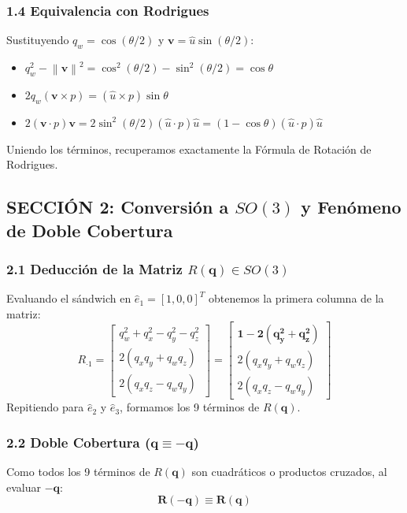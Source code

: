 \documentclass[11pt, a4paper]{article}
\begin{document}
\subsubsection*{1.4 Equivalencia con Rodrigues}
Sustituyendo $q_w = \cos(\theta/2)$ y $\mathbf{v} = \hat{u}\sin(\theta/2)$:
\begin{itemize}
    \item $q_w^2 - \left\|\mathbf{v}\right\|^2 = \cos^2(\theta/2) - \sin^2(\theta/2) = \cos\theta$
    \item $2q_w(\mathbf{v} \times p) = (\hat{u} \times p)\sin\theta$
    \item $2(\mathbf{v} \cdot p)\mathbf{v} = 2\sin^2(\theta/2)(\hat{u} \cdot p)\hat{u} = (1 - \cos\theta)(\hat{u} \cdot p)\hat{u}$
\end{itemize}
Uniendo los términos, recuperamos exactamente la Fórmula de Rotación de Rodrigues.

\subsection*{SECCIÓN 2: Conversión a $SO(3)$ y Fenómeno de Doble Cobertura}

\subsubsection*{2.1 Deducción de la Matriz $R(\mathbf{q}) \in SO(3)$}
Evaluando el sándwich en $\hat{e}_1 = [1, 0, 0]^T$ obtenemos la primera columna de la matriz:
\begin{equation*}
    R_{\cdot 1} = \begin{bmatrix} q_w^2 + q_x^2 - q_y^2 - q_z^2 \\ 2(q_x q_y + q_w q_z) \\ 2(q_x q_z - q_w q_y) \end{bmatrix} = \begin{bmatrix} \mathbf{1 - 2(q_y^2 + q_z^2)} \\ 2(q_x q_y + q_w q_z) \\ 2(q_x q_z - q_w q_y) \end{bmatrix}
\end{equation*}
Repitiendo para $\hat{e}_2$ y $\hat{e}_3$, formamos los 9 términos de $R(\mathbf{q})$.

\subsubsection*{2.2 Doble Cobertura ($\mathbf{q} \equiv -\mathbf{q}$)}
Como todos los 9 términos de $R(\mathbf{q})$ son cuadráticos o productos cruzados, al evaluar $-\mathbf{q}$:
\begin{equation}
    \mathbf{R(-\mathbf{q}) \equiv R(\mathbf{q})}
\end{equation}
\end{document}
